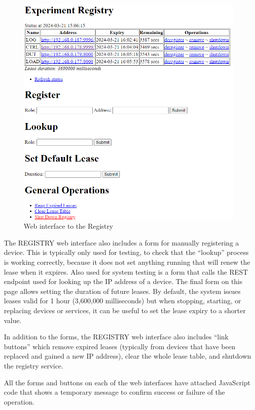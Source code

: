 \begin{figure}[ht!]
\centering
\includegraphics[width=\columnwidth]{Figures/screenshots/Registry.png}
\caption{Web interface to the Registry}
\label{UI registry}
\end{figure}

The REGISTRY web interface also includes a form for manually registering a device. This is typically only used for testing, to check that the \enquote{lookup} process is working correctly, because it does not set anything running that will renew the lease when it expires. Also used for system testing is a form that calls the REST endpoint used for looking up the IP address of a device. The final form on this page allows setting the duration of future leases. By default, the system issues leases valid for 1 hour (3,600,000 milliseconds) but when stopping, starting, or replacing devices or services, it can be useful to set the lease expiry to a shorter value.

In addition to the forms, the REGISTRY web interface also includes \enquote{link buttons} which remove expired leases (typically from devices that have been replaced and gained a new IP address), clear the whole lease table, and shutdown the registry service.

All the forms and buttons on each of the web interfaces have attached JavaScript code that shows a temporary message to confirm success or failure of the operation.

